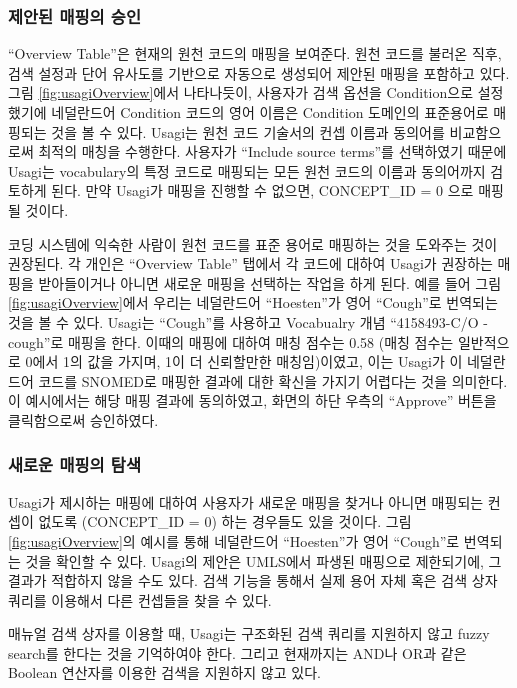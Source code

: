\documentclass[11pt]{book}
\theoremstyle{definition}
\theoremstyle{definition}
\theoremstyle{definition}
\theoremstyle{remark}
\begin{document}
\subsubsection*{제안된 매핑의 승인}\label{--}

``Overview Table''은 현재의 원천 코드의 매핑을 보여준다. 원천 코드를
불러온 직후, 검색 설정과 단어 유사도를 기반으로 자동으로 생성되어 제안된
매핑을 포함하고 있다. 그림 \ref{fig:usagiOverview}에서 나타나듯이,
사용자가 검색 옵션을 Condition으로 설정했기에 네덜란드어 Condition
코드의 영어 이름은 Condition 도메인의 표준용어로 매핑되는 것을 볼 수
있다. Usagi는 원천 코드 기술서의 컨셉 이름과 동의어를 비교함으로써
최적의 매칭을 수행한다. 사용자가 ``Include source terms''를 선택하였기
때문에 Usagi는 vocabulary의 특정 코드로 매핑되는 모든 원천 코드의 이름과
동의어까지 검토하게 된다. 만약 Usagi가 매핑을 진행할 수 없으면,
CONCEPT\_ID = 0 으로 매핑될 것이다.

코딩 시스템에 익숙한 사람이 원천 코드를 표준 용어로 매핑하는 것을
도와주는 것이 권장된다. 각 개인은 ``Overview Table'' 탭에서 각 코드에
대하여 Usagi가 권장하는 매핑을 받아들이거나 아니면 새로운 매핑을
선택하는 작업을 하게 된다. 예를 들어 그림 \ref{fig:usagiOverview}에서
우리는 네덜란드어 ``Hoesten''가 영어 ``Cough''로 번역되는 것을 볼 수
있다. Usagi는 ``Cough''를 사용하고 Vocabualry 개념 ``4158493-C/O -
cough''로 매핑을 한다. 이때의 매핑에 대하여 매칭 점수는 0.58 (매칭
점수는 일반적으로 0에서 1의 값을 가지며, 1이 더 신뢰할만한
매칭임)이였고, 이는 Usagi가 이 네덜란드어 코드를 SNOMED로 매핑한 결과에
대한 확신을 가지기 어렵다는 것을 의미한다. 이 예시에서는 해당 매핑
결과에 동의하였고, 화면의 하단 우측의 ``Approve'' 버튼을 클릭함으로써
승인하였다.

\subsubsection*{새로운 매핑의 탐색}\label{--}

Usagi가 제시하는 매핑에 대하여 사용자가 새로운 매핑을 찾거나 아니면
매핑되는 컨셉이 없도록 (CONCEPT\_ID = 0) 하는 경우들도 있을 것이다. 그림
\ref{fig:usagiOverview}의 예시를 통해 네덜란드어 ``Hoesten''가 영어
``Cough''로 번역되는 것을 확인할 수 있다. Usagi의 제안은 UMLS에서 파생된
매핑으로 제한되기에, 그 결과가 적합하지 않을 수도 있다. 검색 기능을
통해서 실제 용어 자체 혹은 검색 상자 쿼리를 이용해서 다른 컨셉들을 찾을
수 있다.

매뉴얼 검색 상자를 이용할 때, Usagi는 구조화된 검색 쿼리를 지원하지 않고
fuzzy search를 한다는 것을 기억하여야 한다. 그리고 현재까지는 AND나 OR과
같은 Boolean 연산자를 이용한 검색을 지원하지 않고 있다.
\end{document}
